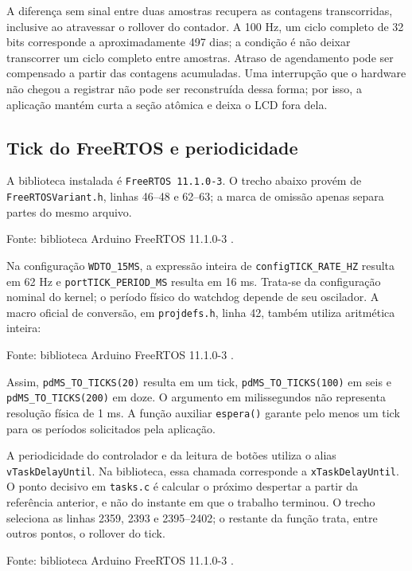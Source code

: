A diferença sem sinal entre duas amostras recupera as contagens transcorridas, inclusive ao atravessar o rollover do contador. A 100 Hz, um ciclo completo de 32 bits corresponde a aproximadamente 497 dias; a condição é não deixar transcorrer um ciclo completo entre amostras. Atraso de agendamento pode ser compensado a partir das contagens acumuladas. Uma interrupção que o hardware não chegou a registrar não pode ser reconstruída dessa forma; por isso, a aplicação mantém curta a seção atômica e deixa o LCD fora dela.

\subsection{Tick do FreeRTOS e periodicidade}

A biblioteca instalada é \texttt{FreeRTOS 11.1.0-3}. O trecho abaixo provém de \texttt{FreeRTOSVariant.h}, linhas 46–48 e 62–63; a marca de omissão apenas separa partes do mesmo arquivo.


\noindent Fonte: biblioteca Arduino FreeRTOS 11.1.0-3 \autocite{fonte7}.

Na configuração \texttt{WDTO\_15MS}, a expressão inteira de \texttt{configTICK\_RATE\_HZ} resulta em 62 Hz e \texttt{portTICK\_PERIOD\_MS} resulta em 16 ms. Trata-se da configuração nominal do kernel; o período físico do watchdog depende de seu oscilador. A macro oficial de conversão, em \texttt{projdefs.h}, linha 42, também utiliza aritmética inteira:


\noindent Fonte: biblioteca Arduino FreeRTOS 11.1.0-3 \autocite{fonte8}.

Assim, \texttt{pdMS\_TO\_TICKS(20)} resulta em um tick, \texttt{pdMS\_TO\_TICKS(100)} em seis e \texttt{pdMS\_TO\_TICKS(200)} em doze. O argumento em milissegundos não representa resolução física de 1 ms. A função auxiliar \texttt{espera()} garante pelo menos um tick para os períodos solicitados pela aplicação.

A periodicidade do controlador e da leitura de botões utiliza o alias \texttt{vTaskDelayUntil}. Na biblioteca, essa chamada corresponde a \texttt{xTaskDelayUntil}. O ponto decisivo em \texttt{tasks.c} é calcular o próximo despertar a partir da referência anterior, e não do instante em que o trabalho terminou. O trecho seleciona as linhas 2359, 2393 e 2395–2402; o restante da função trata, entre outros pontos, o rollover do tick.


\noindent Fonte: biblioteca Arduino FreeRTOS 11.1.0-3 \autocite{fonte9}.

